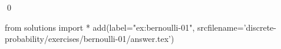 
\begin{ex} 
  \label{ex:bernoulli-01}
  
  \qed
\end{ex} 
\begin{python0}
from solutions import *
add(label="ex:bernoulli-01",
    srcfilename='discrete-probability/exercises/bernoulli-01/answer.tex') 
\end{python0}
